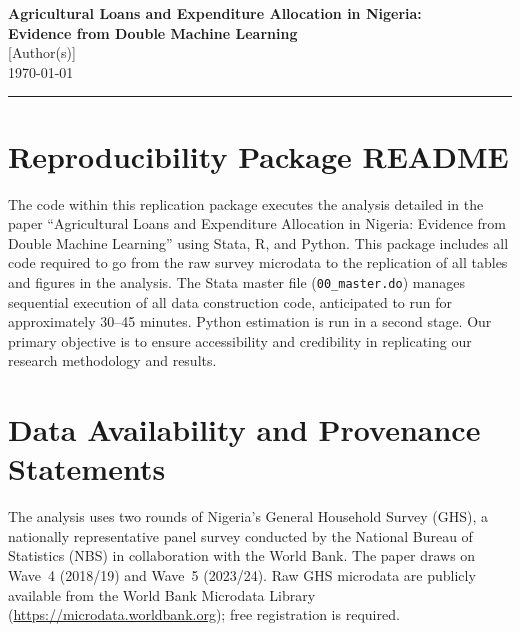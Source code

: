 \documentclass[11pt]{article}
\begin{document}
\begin{center}
    {\large\bfseries Agricultural Loans and Expenditure Allocation in Nigeria:\\[2pt]
    Evidence from Double Machine Learning} \\[8pt]
    {\normalsize [Author(s)]} \\[4pt]
    {\small \today}
\end{center}

\vspace{4pt}\hrule\vspace{8pt}

\tableofcontents
\newpage

\section{Reproducibility Package README}

The code within this replication package executes the analysis detailed in the
paper ``Agricultural Loans and Expenditure Allocation in Nigeria: Evidence from
Double Machine Learning'' using Stata, R, and Python. This package includes all
code required to go from the raw survey microdata to the replication of all
tables and figures in the analysis. The Stata master file (\texttt{00\_master.do})
manages sequential execution of all data construction code, anticipated to run
for approximately 30--45 minutes. Python estimation is run in a second stage.
Our primary objective is to ensure accessibility and credibility in replicating
our research methodology and results.

\section{Data Availability and Provenance Statements}

The analysis uses two rounds of Nigeria's General Household Survey (GHS), a
nationally representative panel survey conducted by the National Bureau of
Statistics (NBS) in collaboration with the World Bank. The paper draws on
Wave~4 (2018/19) and Wave~5 (2023/24). Raw GHS microdata are publicly
available from the World Bank Microdata Library
(\url{https://microdata.worldbank.org}); free registration is required.
\end{document}

